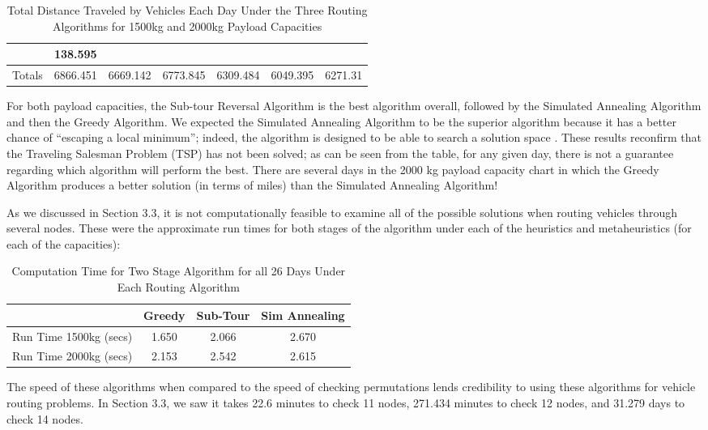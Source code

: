 \documentclass[11pt]{article}
\begin{document}
\begin{table}[H]
\begin{tabular}{l|c|c|c|c|c|c}
& 138.595 \\ \hline Totals & 6866.451 & 6669.142 & 6773.845 & 6309.484 & 6049.395 & 6271.31 \\


\hline
\end{tabular}
\caption{\label{tab:widgets} Total Distance Traveled by Vehicles Each Day Under the Three Routing Algorithms for 1500kg and 2000kg Payload Capacities}
\end{table}

For both payload capacities, the Sub-tour Reversal Algorithm is the best algorithm overall, followed by the Simulated Annealing Algorithm and then the Greedy Algorithm.  We expected the Simulated Annealing Algorithm to be the superior algorithm because it has a better chance of ``escaping a local minimum''; indeed, the algorithm is designed to be able to search a solution space \cite{LPOR_textbook}.  These results reconfirm that the Traveling Salesman Problem (TSP) has not been solved; as can be seen from the table, for any given day, there is not a guarantee regarding which algorithm will perform the best.  There are several days in the 2000 kg payload capacity chart in which the Greedy Algorithm produces a better solution (in terms of miles) than the Simulated Annealing Algorithm!

As we discussed in Section 3.3, it is not computationally feasible to examine all of the possible solutions when routing vehicles through several nodes.  These were the approximate run times for both stages of the algorithm under each of the heuristics and metaheuristics (for each of the capacities):

\begin{table}[H]
\centering
\begin{tabular}{l|c|c|c}
\hline
 & \textbf{Greedy} & \textbf{Sub-Tour} & \textbf{Sim Annealing} \\ \hline
 Run Time 1500kg (secs) & 1.650 & 2.066 & 2.670  \\
 Run Time 2000kg (secs) & 2.153 & 2.542 & 2.615 \\
 
\hline
\end{tabular}
\caption{\label{tab:widgets} Computation Time for Two Stage Algorithm for all 26 Days Under Each Routing Algorithm}
\end{table}

\noindent The speed of these algorithms when compared to the speed of checking permutations lends credibility to using these algorithms for vehicle routing problems.  In Section 3.3, we saw it takes 22.6 minutes to check 11 nodes, 271.434 minutes to check 12 nodes, and 31.279 days to check 14 nodes. 
\end{document}
